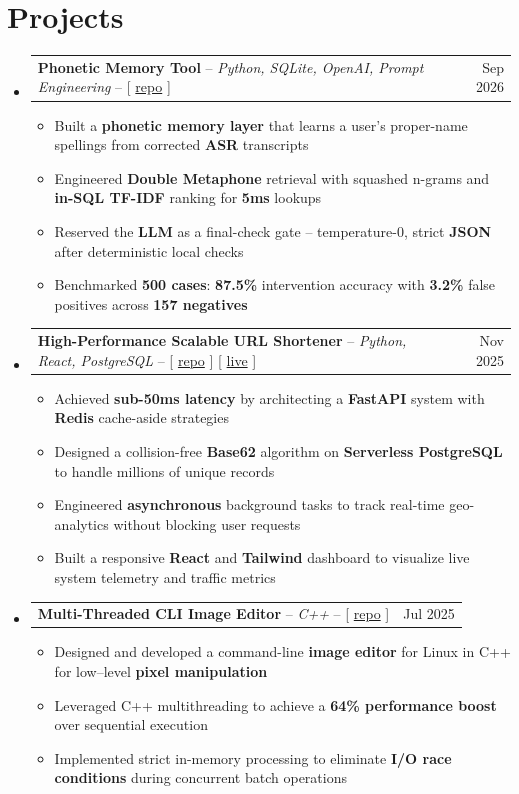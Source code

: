 \documentclass[letterpaper,11pt]{article}
\makeatletter
\newcommand{\resumeItem}[1]{\item\small{{#1 \vspace{-2pt}}}}
\newcommand{\resumeProjectHeading}[2]{
    \item
    \begin{tabular*}{0.97\textwidth}{l@{\extracolsep{\fill}}r}
      \small#1 & #2 \\
    \end{tabular*}\vspace{-7pt}
}
\newcommand{\resumeSubHeadingListStart}{\begin{itemize}[leftmargin=0.15in, label={}]}
\newcommand{\resumeSubHeadingListEnd}{\end{itemize}}
\newcommand{\resumeItemListStart}{\begin{itemize}}
\newcommand{\resumeItemListEnd}{\end{itemize}\vspace{-5pt}}
\makeatother
\begin{document}
\section{Projects}
    \resumeSubHeadingListStart
      \resumeProjectHeading
      {\textbf{Phonetic Memory Tool} -- \emph{Python, SQLite, OpenAI, Prompt Engineering} -- [ \href{https://github.com/savar95x/asr-phonetic-memory}{repo} ]}{Sep 2026}
          \resumeItemListStart
        \resumeItem{Built a \textbf{phonetic memory layer} that learns a user's proper-name spellings from corrected \textbf{ASR} transcripts}
        \resumeItem{Engineered \textbf{Double Metaphone} retrieval with squashed n-grams and \textbf{in-SQL TF-IDF} ranking for \textbf{5ms} lookups}
        \resumeItem{Reserved the \textbf{LLM} as a final-check gate -- temperature-0, strict \textbf{JSON} after deterministic local checks}
        \resumeItem{Benchmarked \textbf{500 cases}: \textbf{87.5\%} intervention accuracy with \textbf{3.2\%} false positives across \textbf{157 negatives}}
          \resumeItemListEnd
      \resumeProjectHeading
      {\textbf{High-Performance Scalable URL Shortener} -- \emph{Python, React, PostgreSQL} -- [ \href{https://github.com/savar95x/url-shortner}{repo} ] [ \href{https://url-shortner-backend-rose.vercel.app/}{live} ]}{Nov 2025}
          \resumeItemListStart
        \resumeItem{Achieved \textbf{sub-50ms latency} by architecting a \textbf{FastAPI} system with \textbf{Redis} cache-aside strategies}
        \resumeItem{Designed a collision-free \textbf{Base62} algorithm on \textbf{Serverless PostgreSQL} to handle millions of unique records}
        \resumeItem{Engineered \textbf{asynchronous} background tasks to track real-time geo-analytics without blocking user requests}
        \resumeItem{Built a responsive \textbf{React} and \textbf{Tailwind} dashboard to visualize live system telemetry and traffic metrics}
          \resumeItemListEnd
      \resumeProjectHeading
      {\textbf{Multi-Threaded CLI Image Editor} -- \emph{C++} -- [ \href{https://github.com/savar95x/imgedit}{repo} ]}{Jul 2025}
          \resumeItemListStart
        \resumeItem{Designed and developed a command-line \textbf{image editor} for Linux in C++ for low--level \textbf{pixel manipulation}}
        \resumeItem{Leveraged C++ multithreading to achieve a \textbf{64\% performance boost} over sequential execution}
        \resumeItem{Implemented strict in-memory processing to eliminate \textbf{I/O race conditions} during concurrent batch operations}
          \resumeItemListEnd
    \resumeSubHeadingListEnd
\end{document}
